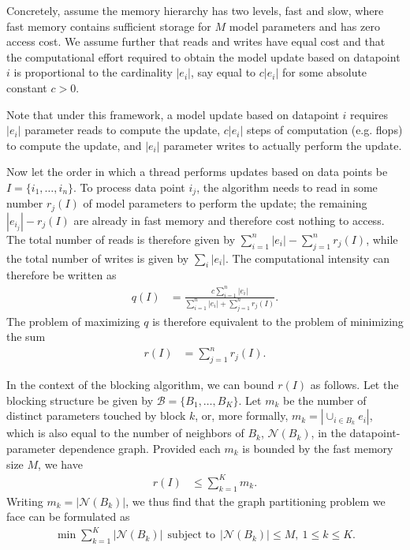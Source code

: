 \documentclass[times,11pt]{article}
\numberwithin{equation}{section}		%
\numberwithin{figure}{section}			%
\numberwithin{table}{section}				%
\newcommand{\blocks}{\mathcal{B}}
\newcommand{\neighs}[1]{\mathcal{N}\left({#1}\right)}
\begin{document}
Concretely, assume the memory hierarchy has two levels, fast and slow, where fast memory contains sufficient storage for $M$ model parameters and has zero access cost. We assume further that reads and writes have equal cost and that the computational effort required to obtain the model update based on datapoint $i$ is proportional to the cardinality $|e_{i}|$, say equal to $c|e_{i}|$ for some absolute constant $c > 0$. 

Note that under this framework, a model update based on datapoint $i$ requires $|e_{i}|$ parameter reads to compute the update, $c|e_{i}|$ steps of computation (e.g. flops) to compute the update, and $|e_{i}|$ parameter writes to actually perform the update. 

Now let the order in which a thread performs updates based on data points be $I = \lbrace i_{1}, \dots, i_{n}\rbrace$. To process data point $i_{j}$, the
algorithm needs to read in some number $r_{j}\left(I\right)$ of model parameters to perform the update; the remaining $|e_{i_j}| - r_{j}\left(I\right)$ are
already in fast memory and therefore cost nothing to access. The total number of reads is therefore given by $\sum_{i = 1}^{n} |e_{i}| - \sum_{j = 1}^{n} r_{j}\left(I\right)$, while the total number of writes is given by $\sum_{i} |e_i|$. The computational intensity can therefore be written as
\begin{align}
q\left(I\right) & = \frac{c\sum_{i = 1}^{n} |e_{i}|}{\sum_{i = 1}^{n} |e_{i}| + \sum_{j = 1}^{n} r_{j}\left(I\right)} . 
\end{align}
The problem of maximizing $q$ is therefore equivalent to the problem of minimizing the sum
\begin{align}
r\left(I\right) & = \sum_{j = 1}^{n} r_{j}\left(I\right) . 
\end{align}

In the context of the blocking algorithm, we can bound $r\left(I\right)$ as follows. Let the blocking structure be given by $\blocks = \lbrace B_{1}, \dots, B_{K} \rbrace$. Let $m_{k}$ be the number of distinct parameters touched by block $k$, or, more formally, $m_{k} = \left|\cup_{i \in B_{k}} e_{i}\right|$, which is also
equal to the number of neighbors of $B_{k}$, $\neighs{B_{k}}$, in the datapoint-parameter dependence graph. Provided each $m_{k}$ is bounded by the fast memory size $M$, we have
\begin{align}
r\left(I\right) & \leq \sum_{k = 1}^{K} m_{k} . 
\end{align}
Writing $m_{k} = \left|\neighs{B_{k}}\right|$, we thus find that the graph partitioning problem we face can be formulated as
\begin{align}\label{eq:comb-opt}
\min \sum_{k = 1}^{K} \left|\neighs{B_{k}}\right| ~~ \text{subject to}~~ \left|\neighs{B_{k}}\right| \leq M,~ 1 \leq k \leq K .
\end{align}
\end{document}

